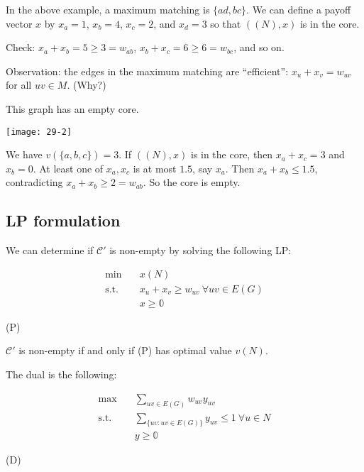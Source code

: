 \documentclass[12pt,letterpaper]{report}
\begin{document}
\begin{ex}
  In the above example, a maximum matching is $\{ad, bc\}$.
  We can define a payoff vector $x$ by $x_a = 1$, $x_b = 4$, $x_c = 2$, and $x_d = 3$ so that
  $((N), x)$ is in the core.

  Check: $x_a + x_b = 5 \geq 3 = w_{ab}$, $x_b + x_c = 6 \geq 6 = w_{bc}$, and so on.
\end{ex}

Observation: the edges in the maximum matching are ``efficient'': $x_u + x_v = w_{uv}$ for all
$uv \in M$.
(Why?)

\begin{ex}
  This graph has an empty core.

  \begin{center}
    \texttt{[image: 29-2]}
  \end{center}

  We have $v(\{a, b, c\}) = 3$.
  If $((N), x)$ is in the core, then $x_a + x_c = 3$ and $x_b = 0$.
  At least one of $x_a, x_c$ is at most $1.5$, say $x_a$.
  Then $x_a + x_b \leq 1.5$, contradicting $x_a + x_b \geq 2 = w_{ab}$.
  So the core is empty.
\end{ex}

\pagebreak
\subsection{LP formulation}

We can determine if $\mathcal{C}'$ is non-empty by solving the following LP:

\begin{minipage}{0.9\textwidth}
  \begin{align*}
    \min \quad & x(N) \\
    \text{s.t.} \quad
    & x_u + x_v \geq w_{uv} \ \forall uv \in E(G) \\
    & x \geq \mathbb{0}
  \end{align*}
\end{minipage}\hfill\begin{minipage}{0.08\textwidth}
  (P)
\end{minipage}

$\mathcal{C}'$ is non-empty if and only if (P) has optimal value $v(N)$.

The dual is the following:

\begin{minipage}{0.9\textwidth}
  \begin{align*}
    \max \quad & \sum_{uv \in E(G)} w_{uv} y_{uv} \\
    \text{s.t.} \quad
    & \sum_{ \{uv : uv \in E(G)\} } y_{uv} \leq 1 \ \forall u \in N \\
    & y \geq \mathbb{0}
  \end{align*}
\end{minipage}\hfill\begin{minipage}{0.08\textwidth}
  (D)
\end{minipage}
\end{document}
